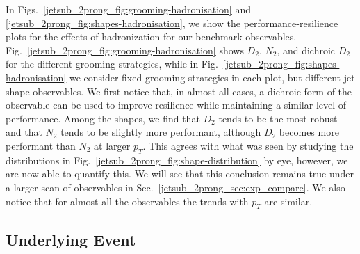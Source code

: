 \documentclass[11pt]{cernrep}
\begin{document}
In Figs.~\ref{jetsub_2prong_fig:grooming-hadronisation} and
\ref{jetsub_2prong_fig:shapes-hadronisation}, we show the
performance-resilience plots for the effects of hadronization for our
benchmark observables.
%
Fig.~\ref{jetsub_2prong_fig:grooming-hadronisation} shows $D_2$, $N_2$, and dichroic $D_2$ for the different grooming strategies, while in Fig.~\ref{jetsub_2prong_fig:shapes-hadronisation} we consider fixed grooming strategies in each plot, but different jet shape observables.
%
We first notice that, in almost all cases, a dichroic form of the observable can be used to improve resilience while maintaining a similar level of performance.
%
Among the shapes, we find that $D_2$ tends to be the most robust and
that $N_2$ tends to be slightly more performant, although $D_2$
becomes more performant than $N_2$ at larger $p_T$.
%
%
This agrees with what was seen by studying the distributions in Fig.~\ref{jetsub_2prong_fig:shape-distribution} by eye, however, we are now able to quantify this.
%
We will see that this conclusion remains true under a larger scan of observables in Sec.~\ref{jetsub_2prong_sec:exp_compare}.
%
We also notice that for almost all the observables the trends with $p_T$ are similar.




\subsection{Underlying Event}\label{jetsub_2prong_sec:UE}
\end{document}
